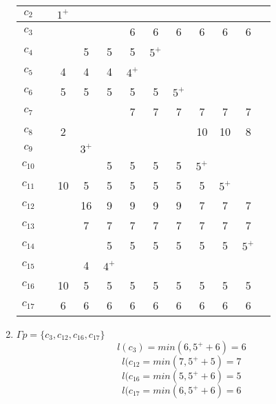 \documentclass[12pt, a4paper] {ncc}
\begin{document}
\begin{enumerate}
\begin{tabular} {|c|c|c|c|c|c|c|c|c|c|c|c|}
    $c_{2}$  & \z  &$1^+$ &     &     &     &     &     &      &     &      \\ \hline
    $c_{3}$  & \z  & \z   & \z  &\z   & 6   &  6  &  6  &  6   & 6   & 6    \\ \hline
    $c_{4}$  & \z  & \z   & 5   & 5   & 5   &$5^+$&     &      &     &      \\ \hline
    $c_{5}$  & \z  & 4    & 4   & 4   &$4^+$&     &     &      &     &      \\ \hline
    $c_{6}$  & \z  & 5    & 5   & 5   & 5   &  5  &$5^+$&      &     &      \\ \hline
    $c_{7}$  & \z  & \z   & \z  & \z  & 7   &  7  &  7  &  7   & 7   & 7    \\ \hline
    $c_{8}$  & \z  & 2    & \z  & \z  & \z  &  \z & \z  &  10  & 10  & 8    \\ \hline
    $c_{9}$  & \z  & \z   &$3^+$&     &     &     &     &      &     &      \\ \hline
    $c_{10}$ & \z  & \z   & \z  & 5   & 5   &  5  &  5  &$5^+$ &     &      \\ \hline
    $c_{11}$ & \z  & 10   &  5  & 5   & 5   &  5  &  5  &  5   &$5^+$&      \\ \hline
    $c_{12}$ & \z  & \z   & 16  & 9   & 9   &  9  &  9  &  7   & 7   & 7    \\ \hline
    $c_{13}$ & \z  & \z   & 7   & 7   & 7   &  7  &  7  &  7   & 7   & 7    \\ \hline
    $c_{14}$ & \z  & \z   & \z  & 5   & 5   &  5  &  5  &  5   & 5   &$5^+$ \\ \hline
    $c_{15}$ & \z  & \z   & 4   &$4^+$&     &     &     &      &     &      \\ \hline
    $c_{16}$ & \z  & 10   & 5   & 5   & 5   &  5  &  5  &  5   & 5   & 5    \\ \hline
    $c_{17}$ & \z  & 6    & 6   & 6   & 6   &  6  &  6  &  6   & 6   & 6    \\ \hline 
\end{tabular}

	\item $\Gamma p = \{ c_3, c_{12}, c_{16}, c_{17}\}$
		$$l(c_3) = min(6, 5^+ + 6) = 6$$
		$$l(c_{12} = min(7, 5^+ + 5) = 7$$
		$$l(c_{16} = min(5, 5^+ + 6) = 5$$
		$$l(c_{17} = min(6, 5^+ + 6) = 6$$


\end{enumerate}
\end{document}
